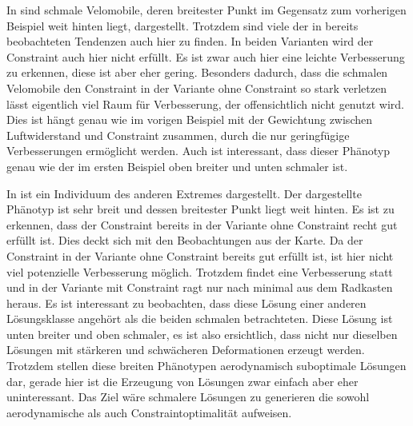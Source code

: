 
In  sind schmale Velomobile, deren breitester Punkt im Gegensatz zum vorherigen Beispiel weit hinten liegt, dargestellt.
Trotzdem sind viele der in  bereits beobachteten Tendenzen auch hier zu finden.
In beiden Varianten wird der Constraint auch hier nicht erfüllt.
Es ist zwar auch hier eine leichte Verbesserung zu erkennen, diese ist aber eher gering.
Besonders dadurch, dass die schmalen Velomobile den Constraint in der Variante ohne Constraint so stark verletzen lässt eigentlich viel Raum für Verbesserung, der offensichtlich nicht genutzt wird.
Dies ist hängt genau wie im vorigen Beispiel mit der Gewichtung zwischen Luftwiderstand und Constraint zusammen, durch die nur geringfügige Verbesserungen ermöglicht werden.
Auch ist interessant, dass dieser Phänotyp genau wie der im ersten Beispiel oben breiter und unten schmaler ist.




In  ist ein Individuum des anderen Extremes dargestellt.
Der dargestellte Phänotyp ist sehr breit und dessen breitester Punkt liegt weit hinten.
Es ist zu erkennen, dass der Constraint bereits in der Variante ohne Constraint recht gut erfüllt ist.
Dies deckt sich mit den Beobachtungen aus der Karte.
Da der Constraint in der Variante ohne Constraint bereits gut erfüllt ist, ist hier nicht viel potenzielle Verbesserung möglich.
Trotzdem findet eine Verbesserung statt und in der Variante mit Constraint ragt nur nach minimal aus dem Radkasten heraus.
Es ist interessant zu beobachten, dass diese Lösung einer anderen Lösungsklasse angehört als die beiden schmalen betrachteten.
Diese Lösung ist unten breiter und oben schmaler, es ist also ersichtlich, dass nicht nur dieselben Lösungen mit stärkeren und schwächeren Deformationen erzeugt werden.
Trotzdem stellen diese breiten Phänotypen aerodynamisch suboptimale Lösungen dar, gerade hier ist die Erzeugung von Lösungen zwar einfach aber eher uninteressant.
Das Ziel wäre schmalere Lösungen zu generieren die sowohl aerodynamische als auch Constraintoptimalität aufweisen.


